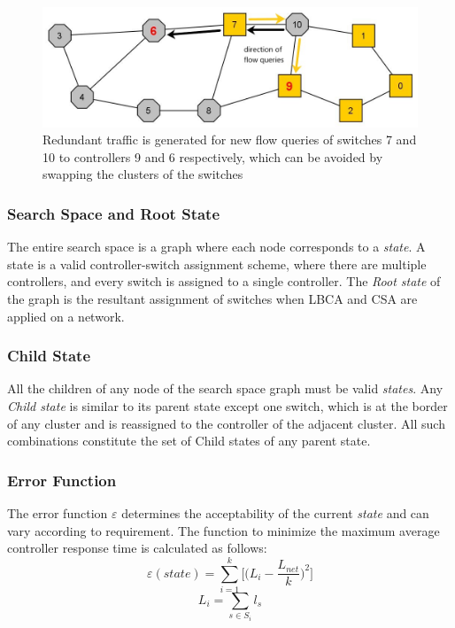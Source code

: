 \documentclass[final,5p,times]{cas-dc}
\begin{document}
	
	\begin{figure}
		\centering
		\includegraphics[width=0.95\linewidth]{Images/Abilene_overlap.jpg}
		\caption{Redundant traffic is generated for new flow queries of switches 7 and 10 to controllers 9 and 6 respectively, which can be avoided by swapping the clusters of the switches} \label{fig:overlap}
	\end{figure}
	
	\subsubsection{Search Space and Root State}
	The entire search space is a graph where each node corresponds to a \textit{state}. A state is a valid controller-switch assignment scheme, where there are multiple controllers, and every switch is assigned to a single controller. The \textit{Root state} of the graph is the resultant assignment of switches when LBCA and CSA are applied on a network.
	
	\subsubsection{Child State}
	All the children of any node of the search space graph must be valid \textit{states}. Any \textit{Child state} is similar to its parent state except one switch, which is at the border of any cluster and is reassigned to the controller of the adjacent cluster. All such combinations constitute the set of Child states of any parent state.
	
	\subsubsection{Error Function}
	The error function $\varepsilon$ determines the acceptability of the current \textit{state} and can vary according to requirement. The function to minimize the maximum average controller response time is calculated as follows:
	\begin{equation}
	\varepsilon(state) = \sum_{i=1}^{k}\Bigg[\Big(L_i - \frac{L_{net}}{k}\Big)^2\Bigg]
	\end{equation}
	\begin{equation} \label{eqn:cload}
	L_i = \sum_{s\in S_i}l_{s}
	\end{equation}
	
\end{document}
